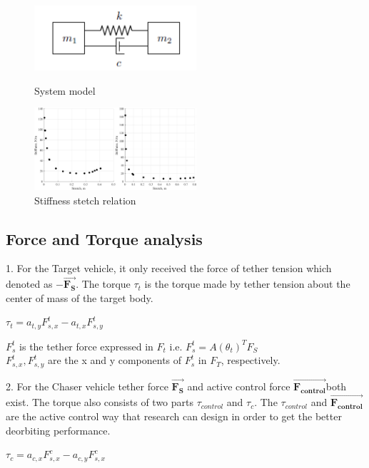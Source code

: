 \begin{figure}[htbp]
\centering
\begin{minipage}[t]{0.48\textwidth}
\centering
\includegraphics[width=6cm]{fig/simulation/Systemmodel}
\caption{System model}
\label{simu-systemmodel}
\end{minipage}
\begin{minipage}[t]{0.48\textwidth}
\centering
\includegraphics[width=6cm]{fig/simulation/StiffnessStetchRelation}
\caption{Stiffness stetch relation}
\end{minipage}
\end{figure}

\subsection{Force and Torque analysis}

1. For the Target vehicle, it only received the force of tether tension which denoted as $\mathbf{-\overrightarrow{F_S}}$. The torque $\tau_t$ is the torque made by tether tension about the center of mass of the target body.
\begin{center}
$\tau_t = a_{t,y}F_{s,x}^t - a_{t,x}F_{s,y}^t$
\end{center} 
\quad $F_{s}^t$ is the tether force expressed in $F_t$ i.e. $F_{s}^t = A(\theta_t)^TF_S$\\
\quad $F_{s,x}^t,F_{s,y}^t$ are the x and y components of $F_{s}^t$ in $F_T$, respectively.   

2. For the Chaser vehicle tether force $\mathbf{\overrightarrow{F_S}}$ and active control force $\mathbf{\overrightarrow{F_{control}}}$both exist. The torque also consists of two parts $\tau_{control}$ and  $\tau_{c}$. The $\tau_{control}$ and $\mathbf{\overrightarrow{F_{control}}}$ are the active control way that research can design in order to get the better deorbiting performance.
\begin{center}
$\tau_c = a_{c,x}F_{s,x}^c - a_{c,y}F_{s,x}^c$
\end{center} 

